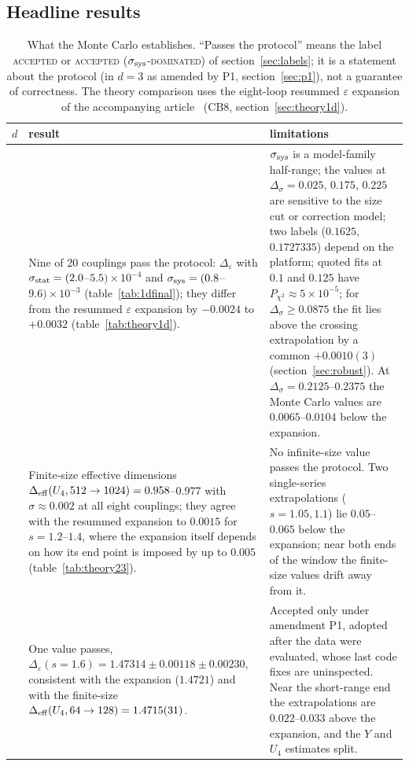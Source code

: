 \documentclass[10pt,a4paper]{article}
\newcommand{\Ds}{\Delta_\sigma}
\newcommand{\De}{\Delta_\varepsilon}
\newcommand{\Deff}{\Delta_{\rm eff}}
\newcommand{\lbl}[1]{{\mdseries\scshape #1}}
\newcommand{\sstat}{\sigma_{\rm stat}}
\newcommand{\ssys}{\sigma_{\rm sys}}
\begin{document}
\subsection{Headline results}
\begin{table}[htbp]\centering\small
\caption{What the Monte Carlo establishes. ``Passes the protocol'' means the label \lbl{accepted} or \lbl{accepted ($\ssys$-dominated)} of
section~\ref{sec:labels}; it is a statement about the protocol (in $d=3$ as amended by P1, section~\ref{sec:p1}), not a guarantee of
correctness. The theory comparison uses the eight-loop resummed $\varepsilon$ expansion of the accompanying article~\cite{Zheng:2026ai}
(CB8, section~\ref{sec:theory1d}).}\label{tab:headline}
\begin{tabular}{@{}>{\raggedright\arraybackslash}p{0.7cm}>{\raggedright\arraybackslash}p{7.2cm}>{\raggedright\arraybackslash}p{7.6cm}@{}}\toprule
$d$ & result & limitations \\\midrule
1 & Nine of 20 couplings pass the protocol: $\De$ with $\sstat=(2.0$--$5.5)\times10^{-4}$ and $\ssys=(0.8$--$9.6)\times10^{-3}$ (table~\ref{tab:1dfinal}); they differ from the resummed $\varepsilon$ expansion by $-0.0024$ to $+0.0032$ (table~\ref{tab:theory1d}). &
$\ssys$ is a model-family half-range; the values at $\Ds=0.025$, $0.175$, $0.225$ are sensitive to the size cut or correction model; two labels ($0.1625$, $0.1727335$) depend on the platform; quoted fits at $0.1$ and $0.125$ have $P_{\chi^2}\approx5\times10^{-5}$; for $\Ds\ge0.0875$ the fit lies above the crossing extrapolation by a common $+0.0010(3)$ (section~\ref{sec:robust}). At $\Ds=0.2125$--$0.2375$ the Monte Carlo values are $0.0065$--$0.0104$ below the expansion. \\
2 & Finite-size effective dimensions $\Deff(U_4,512\to1024)=0.958$--$0.977$ with $\sigma\approx0.002$ at all eight couplings; they agree with the resummed expansion to $0.0015$ for $s=1.2$--$1.4$, where the expansion itself depends on how its end point is imposed by up to $0.005$ (table~\ref{tab:theory23}). &
No infinite-size value passes the protocol. Two single-series extrapolations ($s=1.05,1.1$) lie $0.05$--$0.065$ below the expansion; near both ends of the window the finite-size values drift away from it. \\
3 & One value passes, $\De(s{=}1.6)=1.47314\pm0.00118\pm0.00230$, consistent with the expansion ($1.4721$) and with the finite-size $\Deff(U_4,64\to128)=1.4715(31)$. &
Accepted only under amendment P1, adopted after the data were evaluated, whose last code fixes are uninspected. Near the short-range end the extrapolations are $0.022$--$0.033$ above the expansion, and the $Y$ and $U_4$ estimates split. \\\bottomrule
\end{tabular}
\end{table}
\end{document}
